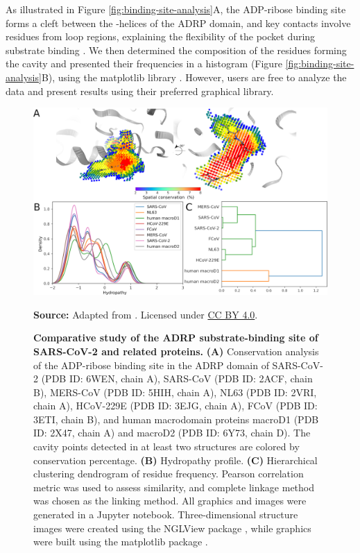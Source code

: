 \documentclass[Ingles]{phdthesis}
\begin{document}
As illustrated in Figure \ref{fig:binding-site-analysis}A, the ADP-ribose binding site forms a cleft between the \textalpha-helices of the \acs{ADRP} domain, and key contacts involve residues from loop regions, explaining the flexibility of the pocket during substrate binding \cite{michalska2020}. We then determined the composition of the residues forming the cavity and presented their frequencies in a histogram (Figure \ref{fig:binding-site-analysis}B), using the matplotlib library \cite{matplotlib}. However, users are free to analyze the data and present results using their preferred graphical library.

\begin{figure}[h]
  \centering
  \includegraphics[scale=0.9]{images/adrp-sars-cov-2-conservation-analysis.png}
  \centerline{\tiny{\textbf{Source:} Adapted from \cite{guerra2021}. Licensed under \href{https://creativecommons.org/licenses/by/4.0/}{CC BY 4.0}.}}
  \caption[Comparative study of the ADRP substrate-binding site of SARS-CoV-2 and related proteins]{\textbf{Comparative study of the ADRP substrate-binding site of SARS-CoV-2 and related proteins.} \textbf{(A)} Conservation analysis of the ADP-ribose binding site in the ADRP domain of SARS-CoV-2 (PDB ID: 6WEN, chain A), SARS-CoV (PDB ID: 2ACF, chain B), MERS-CoV (PDB ID: 5HIH, chain A), NL63 (PDB ID: 2VRI, chain A), HCoV-229E (PDB ID: 3EJG, chain A), FCoV (PDB ID: 3ETI, chain B), and human macrodomain proteins macroD1 (PDB ID: 2X47, chain A) and macroD2 (PDB ID: 6Y73, chain D). The cavity points detected in at least two structures are colored by conservation percentage. \textbf{(B)} Hydropathy profile. \textbf{(C)} Hierarchical clustering dendrogram of residue frequency. Pearson correlation metric was used to assess similarity, and complete linkage method was chosen as the linking method. All graphics and images were generated in a Jupyter notebook. Three-dimensional structure images were created using the NGLView package \cite{nglview}, while graphics were built using the matplotlib package \cite{matplotlib}.}
  \label{fig:conservation-analysis}
\end{figure}
\end{document}
